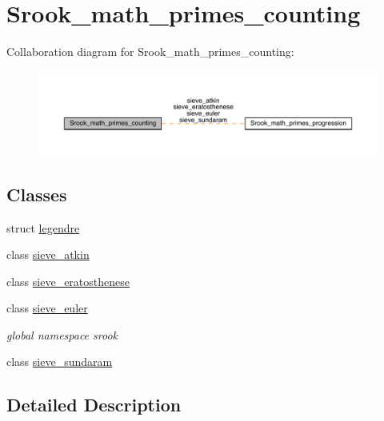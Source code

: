 \hypertarget{group__srook__math__primes__counting}{}\section{Srook\+\_\+math\+\_\+primes\+\_\+counting}
\label{group__srook__math__primes__counting}
Collaboration diagram for Srook\+\_\+math\+\_\+primes\+\_\+counting\+:\nopagebreak
\begin{figure}[H]
\begin{center}
\leavevmode
\includegraphics[width=350pt]{group__srook__math__primes__counting}
\end{center}
\end{figure}
\subsection*{Classes}
\begin{DoxyCompactItemize}
\item 
struct \mbox{\hyperlink{structlegendre}{legendre}}
\item 
class \mbox{\hyperlink{classsieve__atkin}{sieve\+\_\+atkin}}
\item 
class \mbox{\hyperlink{classsieve__eratosthenese}{sieve\+\_\+eratosthenese}}
\item 
class \mbox{\hyperlink{classsieve__euler}{sieve\+\_\+euler}}
\begin{DoxyCompactList}\small\item\em global namespace srook \end{DoxyCompactList}\item 
class \mbox{\hyperlink{classsieve__sundaram}{sieve\+\_\+sundaram}}
\end{DoxyCompactItemize}


\subsection{Detailed Description}
